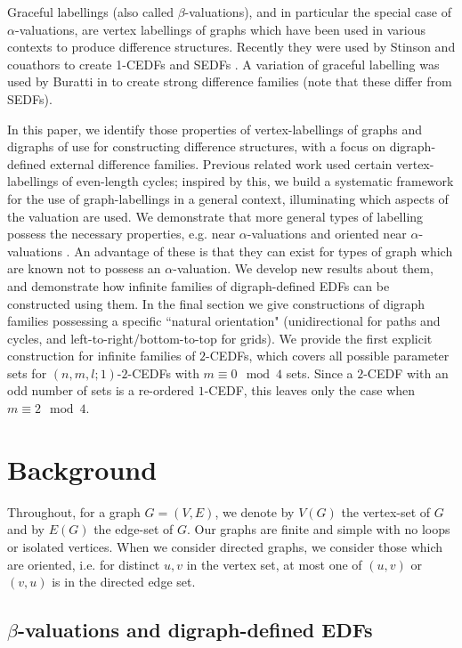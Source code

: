 \documentclass[12pt, a4paper]{article}
\theoremstyle{definition}
\begin{document}
Graceful labellings (also called $\beta$-valuations), and in particular the special case of $\alpha$-valuations, are vertex labellings of graphs which have been used in various contexts to produce difference structures.  Recently they were used by Stinson and couathors to create 1-CEDFs and SEDFs \cite{PatStiCEDF, PatSti1, VeiSti}.  A variation of graceful labelling was used by Buratti in \cite{Bur} to create strong difference families (note that these differ from SEDFs).


In this paper, we identify those properties of vertex-labellings of graphs and digraphs of use for constructing difference structures, with a focus on digraph-defined external difference families. Previous related work \cite{PatStiCEDF} used certain vertex-labellings of even-length cycles; inspired by this, we build a systematic framework for the use of graph-labellings in a general context, illuminating which aspects of the valuation are used.  We demonstrate that more general types of labelling possess the necessary properties, e.g. near $\alpha$-valuations \cite{Cahit,Grannell,El-Zanati} and oriented near $\alpha$-valuations \cite{BloHsu}.  An advantage of these is that they can exist for types of graph which are known not to possess an $\alpha$-valuation. We develop new results about them, and demonstrate how infinite families of digraph-defined EDFs can be constructed using them.  In the final section we give constructions of digraph families possessing a specific ``natural orientation" (unidirectional for paths and cycles, and left-to-right/bottom-to-top for grids).  We provide the first explicit construction for infinite families of $2$-CEDFs, which covers all possible parameter sets for $(n,m,l;1)$-$2$-CEDFs with $m \equiv 0 \mod 4$ sets. Since a $2$-CEDF with an odd number of sets is a re-ordered $1$-CEDF, this leaves only the case when $m \equiv 2 \mod 4$. 

\section{Background}
Throughout, for a graph $G=(V,E)$, we denote by $V(G)$ the vertex-set of $G$ and by $E(G)$ the edge-set of $G$. Our graphs are finite and simple with no loops or isolated vertices. When we consider directed graphs, we consider those which are oriented, i.e. for distinct $u,v$ in the vertex set, at most one of $(u,v)$ or $(v,u)$ is in the directed edge set.


\subsection{$\beta$-valuations and digraph-defined EDFs}
\end{document}
